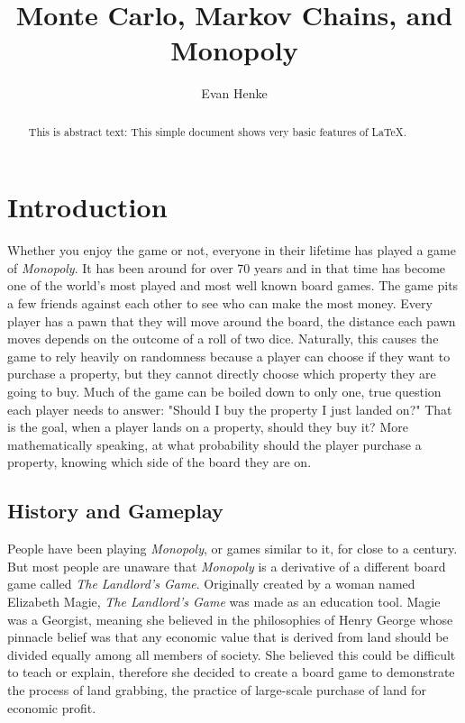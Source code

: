 \documentclass{article}
\begin{document}
\title{Monte Carlo, Markov Chains, and Monopoly}
\author{Evan Henke}

\maketitle

\begin{abstract}
This is abstract text: This simple document shows very basic features of
\LaTeX{}.
\end{abstract}


\section{Introduction}

Whether you enjoy the game or not, everyone in their lifetime has played a game of \textit{Monopoly}.  It has been around for over 70 years and in that time has become one of the world’s most played and most well known board games.  The game pits a few friends against each other to see who can make the most money.  Every player has a pawn that they will move around the board, the distance each pawn moves depends on the outcome of a roll of two dice.  Naturally, this causes the game to rely heavily on randomness because a player can choose if they want to purchase a property, but they cannot directly choose which property they are going to buy.  Much of the game can be boiled down to only one, true question each player needs to answer: "Should I buy the property I just landed on?"  That is the goal, when a player lands on a property, should they buy it?  More mathematically speaking, at what probability should the player purchase a property, knowing which side of the board they are on.

\subsection{History and Gameplay}

People have been playing \textit{Monopoly}, or games similar to it, for close to a century.  But most people are unaware that \textit{Monopoly} is a derivative of a different board game called \textit{The Landlord’s Game}.  Originally created by a woman named Elizabeth Magie, \textit{The Landlord’s Game} was made as an education tool.  Magie was a Georgist, meaning she believed in the philosophies of Henry George whose pinnacle belief was that any economic value that is derived from land should be divided equally among all members of society.  She believed this could be difficult to teach or explain, therefore she decided to create a board game to demonstrate the process of land grabbing, the practice of large-scale purchase of land for economic profit.
\end{document}
